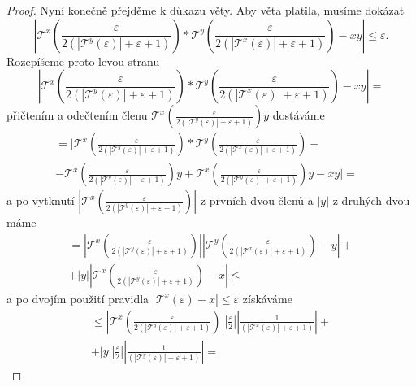 \begin{theorem}
\begin{proof}
Nyní konečně přejděme k důkazu věty. Aby věta platila, musíme dokázat
\begin{equation}
\left| \mathcal{T}^x\left(\frac{\varepsilon}{2(|\mathcal{T}^y(\varepsilon)|+\varepsilon +1)}\right) *\mathcal{T}^y\left(\frac{\varepsilon}{2(|\mathcal{T}^x(\varepsilon)|+\varepsilon +1)}\right) -xy \right|\leq\varepsilon.
\end{equation}
Rozepíšeme proto levou stranu
\begin{equation}
\left| \mathcal{T}^x\left(\frac{\varepsilon}{2(|\mathcal{T}^y(\varepsilon)|+\varepsilon +1)}\right) *\mathcal{T}^y\left(\frac{\varepsilon}{2(|\mathcal{T}^x(\varepsilon)|+\varepsilon +1)}\right) -xy \right| =
\end{equation}
přičtením a odečtením členu $\mathcal{T}^x\left(\frac{\varepsilon}{2(|\mathcal{T}^y(\varepsilon)|+\varepsilon +1)} \right)y$ dostáváme
\begin{equation}
\begin{split}=\bigl\vert \mathcal{T}^x\left(\frac{\varepsilon}{2(|\mathcal{T}^y(\varepsilon)|+\varepsilon +1)}\right) *\mathcal{T}^y\left(\frac{\varepsilon}{2(|\mathcal{T}^x(\varepsilon)|+\varepsilon +1)}\right) -&
\\-\mathcal{T}^x\left(\frac{\varepsilon}{2(|\mathcal{T}^y(\varepsilon)|+\varepsilon +1)} \right)y + \mathcal{T}^x\left(\frac{\varepsilon}{2(|\mathcal{T}^y(\varepsilon)|+\varepsilon +1)} \right)y -xy \bigr\vert =&
\end{split}
\end{equation}
a po vytknutí $|\mathcal{T}^x\left(\frac{\varepsilon}{2(|\mathcal{T}^y(\varepsilon)|+\varepsilon +1)}\right)|$ z prvních dvou členů a $|y|$ z druhých dvou máme
\begin{equation}
\begin{split}
=|\mathcal{T}^x\left(\frac{\varepsilon}{2(|\mathcal{T}^y(\varepsilon)|+\varepsilon +1)}\right)||\mathcal{T}^y\left(\frac{\varepsilon}{2(|\mathcal{T}^x(\varepsilon)|+\varepsilon +1)}\right)-y|+\\+|y||\mathcal{T}^x\left(\frac{\varepsilon}{2(|\mathcal{T}^y(\varepsilon)|+\varepsilon +1)}\right)-x|\leq
\end{split}
\end{equation}
a po dvojím použití pravidla $|\mathcal{T}^x(\varepsilon)-x|\leq\varepsilon$ získáváme
\begin{equation}
\begin{split}
\leq |\mathcal{T}^x\left(\frac{\varepsilon}{2(|\mathcal{T}^y(\varepsilon)|+\varepsilon +1)}\right)||\frac{\varepsilon}{2}||\frac{1}{(|\mathcal{T}^x(\varepsilon)|+\varepsilon +1)}|+\\+|y||\frac{\varepsilon}{2}||\frac{1}{(|\mathcal{T}^y(\varepsilon)|+\varepsilon +1)}|=

\end{split}
\end{equation}
\end{proof}
\end{theorem}
